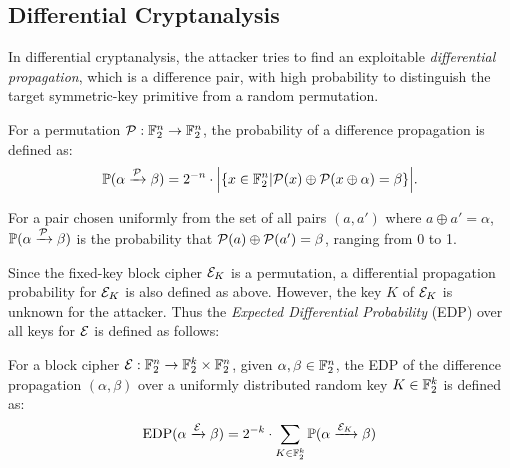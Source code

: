 \subsection{Differential Cryptanalysis}

In differential cryptanalysis, the attacker tries to find an exploitable \textit{differential propagation}, which is a difference pair, with high probability to distinguish the target symmetric-key primitive from a random permutation. 

\begin{definition}
    For a permutation $\mathcal{P}:\mathbb{F}_2^n\rightarrow \mathbb{F}_2^n$, the probability of a difference propagation is defined as:
    \begin{align*}
        \mathbb{P}(\alpha\xrightarrow{\mathcal{P}}\beta)=2^{-n}\cdot\Big|\{x\in\mathbb{F}_2^n|\mathcal{P}(x)\oplus\mathcal{P}(x\oplus\alpha)=\beta\}\Big|.
    \end{align*}
\end{definition}

For a pair chosen uniformly from the set of all pairs $(a,a')$ where $a\oplus a'=\alpha$,
$\mathbb{P}(\alpha\xrightarrow{\mathcal{P}}\beta)$ is the probability that $\mathcal{P}(a)\oplus \mathcal{P}(a')=\beta$, ranging from 0 to 1.

Since the fixed-key block cipher $\mathcal{E}_K$ is a permutation, a differential propagation probability for $\mathcal{E}_K$ is also defined as above. However, the key $K$ of $\mathcal{E}_K$ is unknown for the attacker. Thus the \textit{Expected Differential Probability} (EDP) over all keys for $\mathcal{E}$ is defined as follows:

\begin{definition}
    For a block cipher $\mathcal{E}:\mathbb{F}_2^n\rightarrow \mathbb{F}_2^k\times\mathbb{F}_2^n$, given $\alpha,\beta\in \mathbb{F}_2^n$, the EDP of the difference propagation $(\alpha,\beta)$ over a uniformly distributed random key $K\in \mathbb{F}_2^k$ is defined as:
    \begin{align*}
        \text{EDP}(\alpha\xrightarrow{\mathcal{E}}\beta)=2^{-k}\cdot\sum\limits_{K\in \mathbb{F}_2^k}\mathbb{P}(\alpha\xrightarrow{\mathcal{E}_K}\beta)
    \end{align*}
\end{definition}

